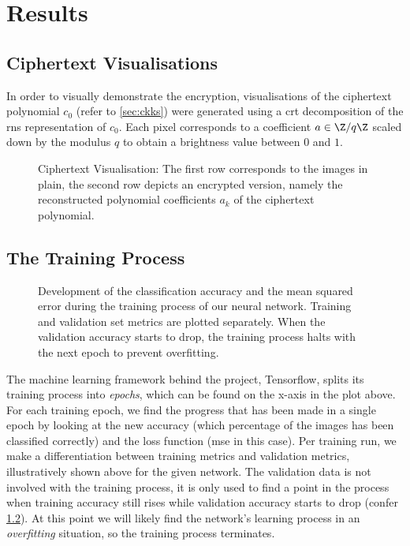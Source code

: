 \chapter{Results}
\label{chap:results}
\section{Ciphertext Visualisations}
In order to visually demonstrate the encryption, visualisations of the ciphertext polynomial $c_0$ (refer to \cref{sec:ckks}) were generated using a \gls{crt} decomposition of the \gls{rns} representation of $c_0$.
Each pixel corresponds to a coefficient $a \in \Z / q\Z$ scaled down by the modulus $q$ to obtain a brightness value between $0$ and $1$.

\begin{figure}[H]
  \centering
  \caption[Visualisation of the plain input images compared to their ciphertext]{Ciphertext Visualisation: The first row corresponds to the images in plain, the second row depicts an encrypted version, namely the reconstructed polynomial coefficients $a_k$ of the ciphertext polynomial.}
  \label{fig:ciphertext-visualisation}
\end{figure}

\section{The Training Process}
\begin{figure}[H]
  \centering
  \pgfplotsset{/pgfplots/group/.cd,vertical sep=1.6cm}
  \caption[Classification accuracy and loss development during training]{
    Development of the classification accuracy and the mean squared error during the training process of our neural network.
    Training and validation set metrics are plotted separately.
    When the validation accuracy starts to drop, the training process halts with the next epoch to prevent overfitting.
  }
  \label{fig:training-history}
\end{figure}

The machine learning framework behind the project, Tensorflow, splits its training process into \textit{epochs}, which can be found on the x-axis in the plot above.
For each training epoch, we find the progress that has been made in a single epoch by looking at the new accuracy (which percentage of the images has been classified correctly) and the loss function (\gls{mse} in this case).
Per training run, we make a differentiation between training metrics and validation metrics, illustratively shown above for the given network.
The validation data is not involved with the training process, it is only used to find a point in the process when training accuracy still rises while validation accuracy starts to drop (confer \cref{fig:training-history}).
At this point we will likely find the network's learning process in an \textit{overfitting} situation, so the training process terminates.

